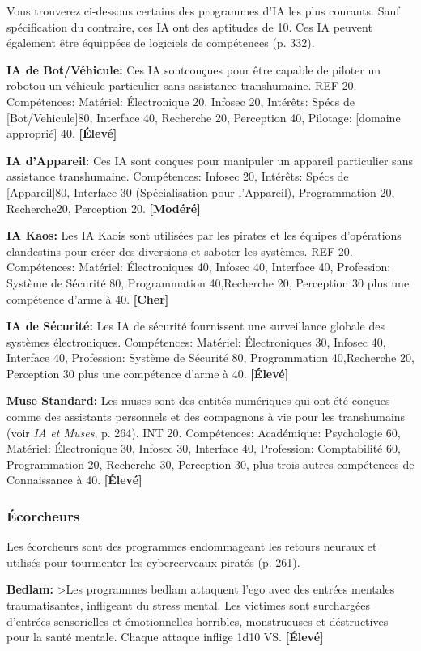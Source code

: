 Vous trouverez ci-dessous certains des programmes d'IA les plus courants. Sauf spécification du contraire, ces IA ont des aptitudes de 10. Ces IA peuvent également être équippées de logiciels de compétences (p. 332). 

\textbf{IA de Bot/Véhicule:} Ces IA sontconçues pour être capable de piloter un robotou un véhicule particulier sans assistance transhumaine. REF 20. Compétences: Matériel: Électronique 20, Infosec 20, Intérêts: Spécs de [Bot/Vehicule]80, Interface 40, Recherche 20, Perception 40, Pilotage: [domaine approprié] 40. \textbf{[Élevé]} 

\textbf{IA d'Appareil:} Ces IA sont conçues pour manipuler un appareil particulier sans assistance transhumaine. Compétences: Infosec 20, Intérêts: Spécs de [Appareil]80, Interface 30 (Spécialisation pour l'Appareil), Programmation 20, Recherche20, Perception 20. \textbf{[Modéré]} 

\textbf{IA Kaos:} Les IA Kaois sont utilisées par les pirates et les équipes d'opérations clandestins pour créer des diversions et saboter les systèmes. REF 20. Compétences: Matériel: Électroniques 40, Infosec 40, Interface 40, Profession: Système de Sécurité 80, Programmation 40,Recherche 20, Perception 30 plus une compétence d'arme à 40. \textbf{[Cher]} 

\textbf{IA de Sécurité:} Les IA de sécurité fournissent une surveillance globale des systèmes électroniques. Compétences: Matériel: Électroniques 30, Infosec 40, Interface 40, Profession: Système de Sécurité 80, Programmation 40,Recherche 20, Perception 30 plus une compétence d'arme à 40. \textbf{[Élevé]} 

\textbf{Muse Standard:} Les muses sont des entités numériques qui ont été conçues comme des assistants personnels et des compagnons à vie pour les transhumains (voir \emph{IA et Muses}, p. 264). INT 20. Compétences: Académique: Psychologie 60, Matériel: Électronique 30, Infosec 30, Interface 40, Profession: Comptabilité 60, Programmation 20, Recherche 30, Perception 30, plus trois autres compétences de Connaissance à 40. \textbf{[Élevé]} 

\subsubsection{Écorcheurs} 

Les écorcheurs sont des programmes endommageant les retours neuraux et utilisés pour tourmenter les cybercerveaux piratés (p. 261). 

\textbf{Bedlam:} >Les programmes bedlam attaquent l'ego avec des entrées mentales traumatisantes, infligeant du stress mental. Les victimes sont surchargées d'entrées sensorielles et émotionnelles horribles, monstrueuses et déstructives pour la santé mentale. Chaque attaque inflige 1d10 VS. \textbf{[Élevé]} 

